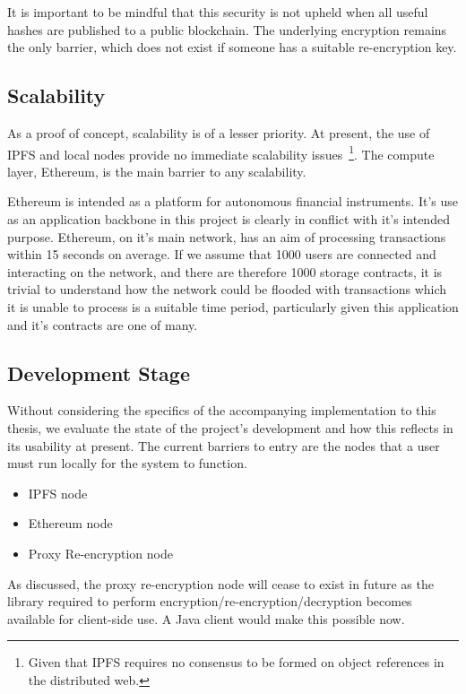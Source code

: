It is important to be mindful that this security is not upheld when all useful hashes are published to a public blockchain. The underlying encryption remains the only barrier, which does not exist if someone has a suitable re-encryption key.

\subsection{Scalability}

As a proof of concept, scalability is of a lesser priority. At present, the use of IPFS and local nodes provide no immediate scalability issues~\footnote{Given that IPFS requires no consensus to be formed on object references in the distributed web.}. The compute layer, Ethereum, is the main barrier to any scalability.

Ethereum is intended as a platform for autonomous financial instruments. It's use as an application backbone in this project is clearly in conflict with it's intended purpose. Ethereum, on it's main network, has an aim of processing transactions within 15 seconds on average. If we assume that 1000 users are connected and interacting on the network, and there are therefore 1000 storage contracts, it is trivial to understand how the network could be flooded with transactions which it is unable to process is a suitable time period, particularly given this application and it's contracts are one of many.

\subsection{Development Stage}

Without considering the specifics of the accompanying implementation to this thesis, we evaluate the state of the project's development and how this reflects in its usability at present. The current barriers to entry are the nodes that a user must run locally for the system to function.

\begin{itemize}
  \item IPFS node
  \item Ethereum node
  \item Proxy Re-encryption node
\end{itemize}

As discussed, the proxy re-encryption node will cease to exist in future as the library required to perform encryption/re-encryption/decryption becomes available for client-side use. A Java client would make this possible now.

